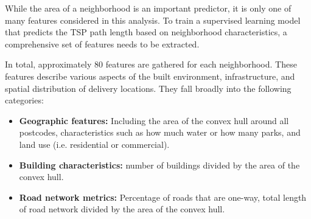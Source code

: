 While the area of a neighborhood is an important predictor, it is only one of many features considered in this analysis.
To train a supervised learning model that predicts the TSP path length based on neighborhood characteristics, a comprehensive set
of features needs to be extracted.

In total, approximately 80 features are gathered for each neighborhood. These features describe various aspects of the built environment, infrastructure,
and spatial distribution of delivery locations. They fall broadly into the following categories:

\begin{itemize}
	\item \textbf{Geographic features:} Including the area of the convex hull around all postcodes, characteristics such as how much water or how many parks,
	      and land use (i.e. residential or commercial).
	\item \textbf{Building characteristics:} number of buildings divided by the area of the convex hull.
	\item \textbf{Road network metrics:} Percentage of roads that are one-way, total length of road network divided by the area of the convex hull.
\end{itemize}
